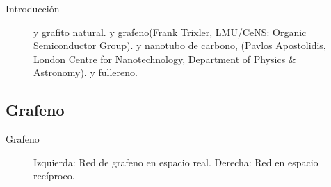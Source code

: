 \documentclass{beamer}
\begin{document}
\begin{frame}{Introducción}
\begin{figure}
\begin{subfigure}[b]{0.2\textwidth}
				\caption{}
				\label{fig:fullerene_image}
			\end{subfigure}
			\caption[Alótropos del carbono mostrando las diferentes dimensionalidades de los nanomateriales]{ y  grafito natural.  y  grafeno(Frank Trixler, LMU/CeNS: Organic Semiconductor Group).  y  nanotubo de carbono, (Pavlos Apostolidis, London Centre for Nanotechnology, Department of Physics \& Astronomy).  y  fullereno\citep{Gimenez2011}.}
			\label{fig:carbon_allotropes}
		\end{figure}
	\end{frame}

	\subsection{Grafeno}
	\begin{frame}{Grafeno}
		\begin{figure}
			\centering
			\caption[Estructura cristalina del grafeno]{Izquierda: Red de grafeno en espacio real. Derecha: Red en espacio recíproco.}
			\label{fig_graphene_lattice}
		\end{figure}
	\end{frame}
\end{document}
